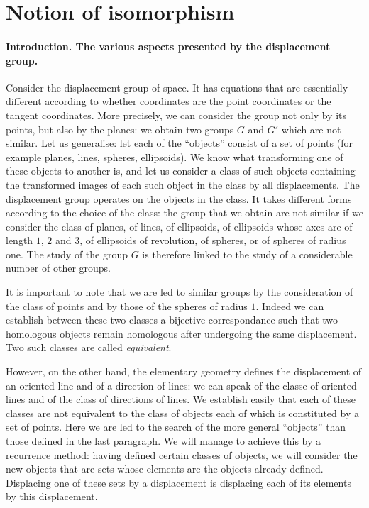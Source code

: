 \section{Notion of isomorphism}
\label{sec:notion-isomorphism}

\paragraph{Introduction. The various aspects presented by the displacement group.}
\label{sec:89} 
Consider the displacement group of space. It has equations that are essentially different according to whether coordinates are the point coordinates or the tangent coordinates. More precisely, we can consider the group not only by its points, but also by the planes: we obtain two groups $G$ and $G'$ which are not similar. Let us generalise: let each of the ``objects'' consist of a set of points (for example planes, lines, spheres, ellipsoids). We know what transforming one of these objects to another is, and let us consider a class of such objects containing the transformed images of each such object in the class by all displacements. The displacement group operates on the objects in the class. It takes different forms according to the choice of the class: the group that we obtain are not similar if we consider the class of planes, of lines, of ellipsoids, of ellipsoids whose axes are of length $1$, $2$ and $3$, of ellipsoids of revolution, of spheres, or of spheres of radius one. The study of the group $G$ is therefore linked to the study of a considerable number of other groups.

It is important to note that we are led to similar groups by the consideration of the class of points and by those of the spheres of radius $1$. Indeed we can establish between these two classes a bijective correspondance such that two homologous objects remain homologous after undergoing the same displacement. Two such classes are called \emph{equivalent}.

However, on the other hand, the elementary geometry defines the displacement of an oriented line and of a direction of lines: we can speak of the classe of oriented lines and of the class of directions of lines. We establish easily that each of these classes are not equivalent to the class of objects each of which is constituted by a set of points. Here we are led to the search of the more general ``objects'' than those defined in the last paragraph. We will manage to achieve this by a recurrence method: having defined certain classes of objects, we will consider the new objects that are sets whose elements are the objects already defined. Displacing one of these sets by a displacement is displacing each of its elements by this displacement.

